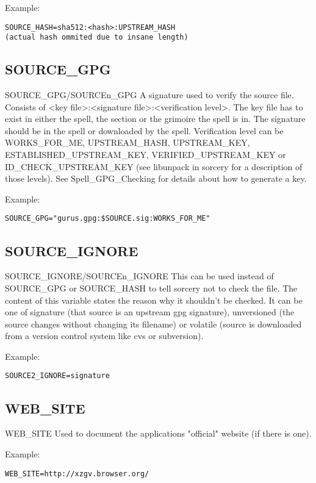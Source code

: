 \documentclass[a4paper,10pt]{book}
\begin{document}
Example:
\begin{verbatim}
SOURCE_HASH=sha512:<hash>:UPSTREAM_HASH
(actual hash ommited due to insane length)
\end{verbatim}

\subsection{SOURCE\_GPG}
SOURCE\_GPG/SOURCEn\_GPG
	A signature used to verify the source file. Consists of
	<key file>:<signature file>:<verification level>. The key file has to
	exist in either the spell, the section or the grimoire the spell is
	in. The signature should be in the spell or downloaded by the spell.
	Verification level can be WORKS\_FOR\_ME, UPSTREAM\_HASH,
UPSTREAM\_KEY,
	ESTABLISHED\_UPSTREAM\_KEY, VERIFIED\_UPSTREAM\_KEY or
	ID\_CHECK\_UPSTREAM\_KEY (see libunpack in sorcery for a description of
	those levels). See Spell\_GPG\_Checking for details about how to
	generate a key.

Example:
\begin{verbatim}
SOURCE_GPG="gurus.gpg:$SOURCE.sig:WORKS_FOR_ME"
\end{verbatim}

\subsection{SOURCE\_IGNORE}
SOURCE\_IGNORE/SOURCEn\_IGNORE
	This can be used instead of SOURCE\_GPG or SOURCE\_HASH to tell sorcery
	not to check the file. The content of this variable states the reason
	why it shouldn't be checked. It can be one of signature (that source
	is an upstream gpg signature), unversioned (the source changes
	without changing its filename) or volatile (source is downloaded from
	a version control system like cvs or subversion).

Example:
\begin{verbatim}
SOURCE2_IGNORE=signature
\end{verbatim}

\subsection{WEB\_SITE}
WEB\_SITE
	Used to document the applications "official" website (if there is one).

Example:
\begin{verbatim}
WEB_SITE=http://xzgv.browser.org/
\end{verbatim}
\end{document}
